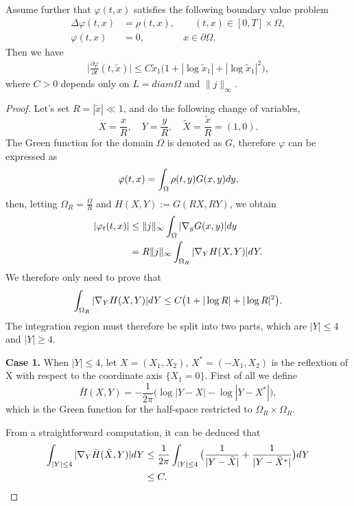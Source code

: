 \documentclass[10pt,a4paper]{amsart}
\begin{document}
\begin{Lemma}\label{L3}
Assume further that  $\varphi(t,x)$ satisfies the following boundary value problem
\begin{align}
\Delta \varphi(t,x)&=\rho(t,x), \qquad (t,x)\in[0,T]\times\Omega,\nonumber\\
\varphi(t,x)&=0,\qquad \qquad x\in\partial\Omega.\nonumber
\end{align}
Then we have
\begin{align}
\Big|\frac{\partial \varphi}{\partial t}(t,\tilde{x})\Big|\leq C\tilde{x}_{1}\big(1+|\log\tilde{x}_{1}|+|\log\tilde{x}_{1}|^{2}\big),\nonumber
\end{align}
where $C>0$ depends only on $L=diam \Omega$ and $\|j\|_{\infty}$.
\end{Lemma}

\begin{proof}
Let's set $R=|\tilde{x}|\ll 1$, and do the following change of variables,
$$X=\frac{x}{R},\quad Y=\frac{y}{R},\quad \tilde{X}=\frac{\tilde{x}}{R}=(1,0).$$
The Green function for the domain $\Omega$ is denoted as $G$, therefore $\varphi$  can be expressed as
$$\varphi(t,x)=\int_{\Omega}\rho(t,y)G(x,y){\rm d}y,$$
then, letting $\Omega_{R}=\frac{\Omega}{R}$ and $H(X,Y):=G(RX,RY)$,   we obtain
\begin{align}
|\varphi_{t}(t,x)|&\leq\|j\|_{\infty}\int_{\Omega}|\nabla_{y}G(x,y)|{\rm d}y \nonumber\\
&=R\|j\|_{\infty}\int_{\Omega_{R}}|\nabla_{Y}H(X,Y)|{\rm d}Y.\nonumber
\end{align}
We therefore only need to prove that
\begin{align}
\int_{\Omega_{R}}|\nabla_{Y}H(X,Y)|{\rm d}Y\leq C\big(1+|\log R|+|\log R|^{2}\big).\label{v7.4}
\end{align}
The integration region must therefore be split into two parts, which are $|Y|\leq 4$ and $|Y|\geq 4$.

{\bf Case 1.}  When $|Y|\leq 4$, let $X=(X_{1},X_{2}),\,X^{*}=(-X_{1},X_{2}) $ is the reflextion of X with respect to the coordinate axis $\{X_{1}=0\}$.
First of all we define
$$\bar{H}(X,Y)=-\frac{1}{2\pi}\big(\log|Y-X|-\log|Y-X^{*}|\big),$$
which is the Green function for the half-space restricted to $\Omega_{R}\times\Omega_{R}$.

From a straightforward computation, it can be deduced that
\begin{align}
\int_{|Y|\leq 4}|\nabla_{Y}\bar{H}(\tilde{X},Y)|{\rm d}Y&\leq \frac{1}{2\pi}\int_{|Y|\leq 4}\big(\frac{1}{|Y-\tilde{X}|}+\frac{1}{|Y-\tilde{X}^{*}|}\big){\rm d}Y\nonumber\\
&\leq C. \nonumber
\end{align}


\end{proof}
\end{document}
